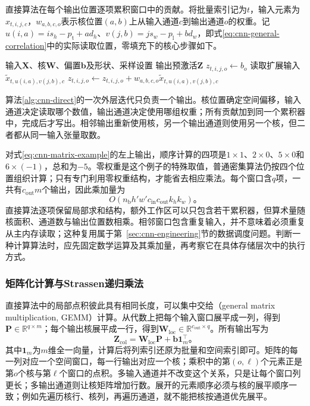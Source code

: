直接算法在每个输出位置逐项累积窗口中的贡献。将批量索引记为$t$，输入元素为$x_{t,i,j,c}$，$w_{a,b,c,o}$表示核位置$(a,b)$上从输入通道$c$到输出通道$o$的权重。记$u(i,a)=is_h-p_{\mathrm t}+ad_h$、$v(j,b)=js_w-p_{\mathrm l}+bd_w$，即式\eqref{eq:cnn-general-correlation}中的实际读取位置，零填充下的核心步骤如下。
\begin{algorithm}[直接多通道互相关]
  \label{alg:cnn-direct}
  \begin{algorithmic}[1]
    \Require 输入$\bm X$、核$\bm W$、偏置$\bm b$及形状、采样设置
    \Ensure 输出预激活$\bm Z$
      \State $z_{t,i,j,o}\gets b_o$
        \State 读取扩展输入$\widetilde x_{t,u(i,a),v(j,b),c}$
        \State $z_{t,i,j,o}\gets z_{t,i,j,o}+w_{a,b,c,o}\widetilde x_{t,u(i,a),v(j,b),c}$
      \EndFor
    \EndFor
  \end{algorithmic}
\end{algorithm}

算法\ref{alg:cnn-direct}的一次外层迭代只负责一个输出。核位置确定空间偏移，输入通道决定读取哪个数值，输出通道决定使用哪组权重；所有贡献加到同一个累积器中，完成后才写出。相邻输出重新使用核，另一个输出通道则使用另一个核，但二者都从同一输入张量取数。

对式\eqref{eq:cnn-matrix-example}的左上输出，顺序计算的四项是$1\times1$、$2\times0$、$5\times0$和$6\times(-1)$，总和为$-5$。零权重是这个例子的特殊取值，普通密集算法仍按四个位置组织计算；只有专门利用零权重结构，才能省去相应乘法。每个窗口含$q$项，一共有$c_{\mathrm{out}}m$个输出，因此乘加量为
\begin{equation}
  O\!\left(n_{\mathrm b}h'w'c_{\mathrm{in}}c_{\mathrm{out}}k_hk_w\right)\text{。}
  \label{eq:cnn-direct-cost}
\end{equation}
直接算法逐项保留局部求和结构，额外工作区可以只包含若干累积器，但算术量随核面积、通道数与输出位置数相乘。相邻窗口包含重复输入，并不意味着必须重复从主内存读取；这种复用属于第~\ref{sec:cnn-engineering}节的数据调度问题。判断一种计算算法时，应先固定数学运算及其乘加量，再考察它在具体存储层次中的执行方式。

\subsubsection{矩阵化计算与Strassen递归乘法}
\label{sec:cnn-matrix-algorithm}

直接算法中的局部点积彼此具有相同长度，可以集中交给（general matrix multiplication, GEMM）计算。从代数上把每个输入窗口展平成一列，得到$\bm P\in\mathbb R^{q\times m}$；每个输出核展平成一行，得到$\bm W_{\mathrm{loc}}\in\mathbb R^{c_{\mathrm{out}}\times q}$。所有输出写为
\begin{equation}
  \bm Z_{\mathrm{col}}=\bm W_{\mathrm{loc}}\bm P+\bm b\bm1_m^\top\text{。}
  \label{eq:cnn-im2col}
\end{equation}
其中$\bm1_m$为$m$维全一向量，计算后将列索引还原为批量和空间索引即可。矩阵的每一列对应一个空间窗口，每一行输出对应一个核；乘积中的第$(o,\ell)$个元素正是第$o$个核与第$\ell$个窗口的点积。多输入通道并不改变这个关系，只是让每个窗口列更长；多输出通道则让核矩阵增加行数。展开的元素顺序必须与核的展平顺序一致；例如先遍历核行、核列，再遍历通道，就不能把核按通道优先展平。

